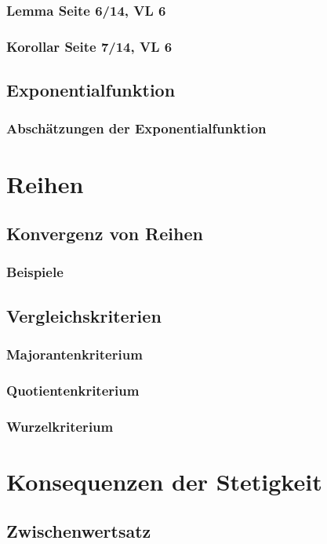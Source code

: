 \documentclass[10pt,a4paper^, twocolumn]{article}
\begin{document}
\subsubsection{Lemma Seite 6/14, VL 6}
\subsubsection{Korollar Seite 7/14, VL 6}
\subsection{Exponentialfunktion}
\subsubsection{Abschätzungen der Exponentialfunktion}

\section{Reihen}
\subsection{Konvergenz von Reihen}
\subsubsection{Beispiele}
\subsection{Vergleichskriterien}
\subsubsection{Majorantenkriterium}
\subsubsection{Quotientenkriterium}
\subsubsection{Wurzelkriterium}

\section{Konsequenzen der Stetigkeit}
\subsection{Zwischenwertsatz} 
\end{document}
